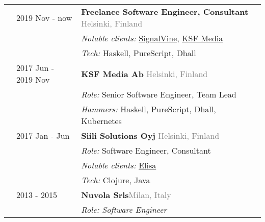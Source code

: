 \documentclass[a4paper,10pt]{article}
\newcommand{\locationRight}[1]{\hfill {\footnotesize \textcolor{gray}{#1}}}
\begin{document}
\noindent
\large
\begin{tabularx}{\textwidth}{ C{0.5cm} L{4.0cm} *{1}{X}}
  & 2019 Nov - now & \textbf{Freelance Software Engineer, Consultant} \locationRight{Helsinki, Finland} \vspace{1 mm}\\
	&			  & \hspace{5mm} {\normalsize \emph{Notable clients:} \href{https://signalvine.com}{SignalVine}, \href{https://ksfmedia.fi}{KSF Media} \vspace{0 mm}} \\
	&			  & \hspace{5mm} {\normalsize \emph{Tech:} Haskell, PureScript, Dhall \vspace{4 mm}} \\
  & 2017 Jun - 2019 Nov & \textbf{KSF Media Ab} \locationRight{Helsinki, Finland} \vspace{1 mm}\\
	&			  & \hspace{5mm} {\normalsize \emph{Role:} Senior Software Engineer, Team Lead \vspace{0 mm}} \\
	&			  & \hspace{5mm} {\normalsize \emph{Hammers:} Haskell, PureScript, Dhall, Kubernetes \vspace{4 mm}} \\
  & 2017 Jan - Jun & \textbf{Siili Solutions Oyj} \locationRight{Helsinki, Finland} \vspace{1 mm}\\
	&			  & \hspace{5mm} {\normalsize \emph{Role:} Software Engineer, Consultant \vspace{0 mm}} \\
	&			  & \hspace{5mm} {\normalsize \emph{Notable clients:} \href{https://elisa.fi}{Elisa} \vspace{0 mm}} \\
	&			  & \hspace{5mm} {\normalsize \emph{Tech:} Clojure, Java \vspace{4mm}} \\
	& 2013 - 2015 & \textbf{Nuvola Srls}\locationRight{Milan, Italy} \vspace{1 mm}\\
	&			  & \hspace{5mm} \emph{\normalsize Role: Software Engineer \vspace{0 mm}}\\

\end{tabularx}
\end{document}
